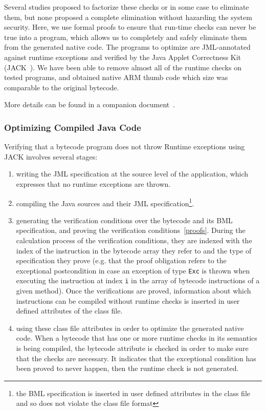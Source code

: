 Several studies proposed to factorize these checks or in some case to eliminate them, but none proposed a complete elimination without hazarding the system security. Here, we use formal proofs to ensure that run-time checks can never be true into a program, which allows us to completely and safely eliminate them from the generated native code. The programs to optimize are JML-annotated against runtime exceptions and verified by the Java Applet Correctness Kit (JACK~\cite{BRL-JACK}). We have been able to remove almost all of the runtime checks on tested programs, and obtained native ARM thumb code which size was comparable to the original bytecode. 

More details can be found in a companion document~\cite{mariela06:cardis}.

\subsubsection{Optimizing Compiled Java Code}
\label{sec:method}

Verifying that a bytecode program does not throw Runtime exceptions using JACK involves several stages:
\begin{enumerate}
\item writing the JML specification at the source level of the application, which expresses that no runtime exceptions are thrown.
\item compiling the Java sources and their JML specification\footnote{the BML specification is inserted in user defined attributes in the class file and so does not violate the class file format}.
\item generating the verification conditions over the bytecode and its BML specification, and proving the verification conditions~\ref{proofs}. During the calculation process of the verification conditions, they are indexed with the index of the instruction in the bytecode array they refer to and the type of specification they prove (e.g. that the proof obligation refers to the exceptional postcondition in case an exception of type \texttt{Exc} is thrown when executing the instruction at index \texttt{i} in the array of bytecode instructions of a given method). Once the verifications are proved, information about which instructions can be compiled without runtime checks is inserted in user defined attributes of the class file.
\item using these class file attributes in order to optimize the generated native code. When a bytecode that has one or more runtime checks in its semantics is being compiled, the bytecode attribute is checked in order to make sure that the checks are necessary. It indicates that the exceptional condition has been proved to never happen, then the runtime check is not generated.
\end{enumerate}

